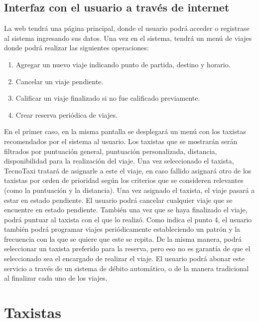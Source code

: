 \subsection{Interfaz con el usuario a través de internet}
La web tendrá una página principal, donde el usuario podrá acceder o registrase al sistema ingresando sus datos. Una vez en el sistema, tendrá un menú de viajes donde podrá realizar las siguientes operaciones:
\begin{enumerate}
\item Agregar un nuevo viaje indicando punto de partida, destino y horario.
\item Cancelar un viaje pendiente.
\item Calificar un viaje finalizado si no fue calificado previamente.
\item Crear reserva periódica de viajes.
\end{enumerate}
En el primer caso, en la misma pantalla se desplegará un menú con los taxistas recomendados por el sistema al usuario. Los taxistas que se mostrarán serán filtrados por puntuación general, puntuación personalizada, distancia, disponibilidad para la realización del viaje. Una vez seleccionado el taxista, TecnoTaxi tratará de asignarle a este el viaje, en caso fallido asignará otro de los taxistas por orden de prioridad según los criterios que se consideren relevantes (como la puntuación y la distancia). Una vez asignado el taxista, el viaje pasará a estar en estado pendiente.
El usuario podrá cancelar cualquier viaje que se encuentre en estado pendiente. También una vez que se haya finalizado el viaje, podrá puntuar al taxista con el que lo realizó.
Como indica el punto 4, el usuario también podrá programar viajes periódicamente estableciendo un patrón y la frecuencia con la que se quiere que este se repita. De la misma manera, podrá seleccionar un taxista preferido para la reserva, pero eso no es garantía de que el seleccionado sea el encargado de realizar el viaje. El usuario podrá abonar este servicio a través de un sistema de débito automático, o de la manera tradicional al finalizar cada uno de los viajes.

\section{Taxistas}

